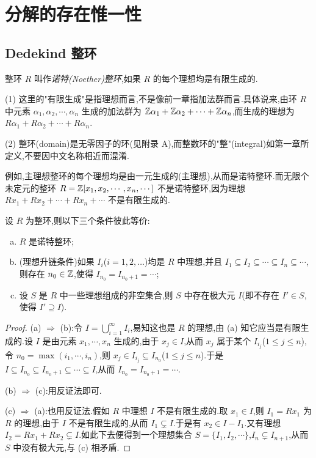 \section{分解的存在惟一性}\label{sec:ch2-s1}

\subsection{Dedekind 整环}\label{sec:ch2-s1-1}

\begin{definition}\label{def:ch2-1}
整环 $R$ 叫作\emph{诺特(Noether)整环},如果 $R$ 的每个理想均是有限生成的.
\end{definition}

\begin{remark}
(1) 这里的"有限生成"是指理想而言,不是像前一章指加法群而言.具体说来,由环 $R$ 中元素 $\alpha_1,\alpha_2,\cdots,\alpha_n$ 生成的加法群为 $\mathbb{Z}\alpha_1+\mathbb{Z}\alpha_2+\cdots+\mathbb{Z}\alpha_n$,而生成的理想为 $R\alpha_1+R\alpha_2+\cdots+R\alpha_n$.

(2) 整环(domain)是无零因子的环(见附录 A),而整数环的"整"(integral)如第一章所定义,不要因中文名称相近而混淆.
\end{remark}

例如,主理想整环的每个理想均是由一元生成的(主理想),从而是诺特整环.而无限个未定元的整环 $R=\mathbb{Z}[x_1,x_2,\cdots,x_n,\cdots]$ 不是诺特整环,因为理想 $Rx_1+Rx_2+\cdots+Rx_n+\cdots$ 不是有限生成的.

\begin{lemma}\label{lem:ch2-1}
设 $R$ 为整环,则以下三个条件彼此等价:
\begin{enumerate}[(a)]
  \item $R$ 是诺特整环;
  \item (理想升链条件)如果 $I_i$($i=1,2,\dots$)均是 $R$ 中理想,并且 $I_1\subseteq I_2\subseteq\cdots\subseteq I_n\subseteq\cdots$,则存在 $n_0\in\mathbb{Z}$,使得 $I_{n_0}=I_{n_0+1}=\cdots$;
  \item 设 $S$ 是 $R$ 中一些理想组成的非空集合,则 $S$ 中存在极大元 $I$(即不存在 $I'\in S$,使得 $I'\supseteq I$).
\end{enumerate}
\end{lemma}

\begin{proof}
(a) $\Rightarrow$ (b):令 $I=\bigcup_{i=1}^{\infty}I_i$,易知这也是 $R$ 的理想,由 (a) 知它应当是有限生成的.设 $I$ 是由元素 $x_1,\cdots,x_n$ 生成的,由于 $x_j\in I$,从而 $x_j$ 属于某个 $I_{i_j}$($1\leqslant j\leqslant n$),令 $n_0=\max(i_1,\cdots,i_n)$,则 $x_j\in I_{i_j}\subseteq I_{n_0}$($1\leqslant j\leqslant n$).于是 $I\subseteq I_{n_0}\subseteq I_{n_0+1}\subseteq\cdots\subseteq I$,从而 $I_{n_0}=I_{n_0+1}=\cdots$.

(b) $\Rightarrow$ (c):用反证法即可.

(c) $\Rightarrow$ (a):也用反证法.假如 $R$ 中理想 $I$ 不是有限生成的.取 $x_1\in I$,则 $I_1=Rx_1$ 为 $R$ 的理想,由于 $I$ 不是有限生成的,从而 $I_1\subsetneq I$.于是有 $x_2\in I-I_1$.又有理想 $I_2=Rx_1+Rx_2\subsetneq I$.如此下去便得到一个理想集合 $S=\{I_1,I_2,\cdots\}$,$I_n\subsetneq I_{n+1}$,从而 $S$ 中没有极大元,与 (c) 相矛盾.
\end{proof}

